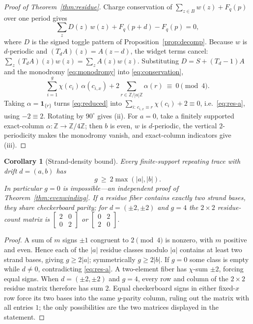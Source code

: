 \documentclass[11pt,letterpaper]{article}
\theoremstyle{plain}
\newtheorem{corollary}[theorem]{Corollary}
\theoremstyle{definition}
\newcommand{\Z}{\mathbb{Z}}
\newcommand{\che}{\chi}
\newcommand{\drift}{d}
\newcommand{\growth}{g}
\begin{document}
\begin{NoHyper}
\begin{proof}[Proof of Theorem~\ref{thm:residue}]
Charge conservation of $\sum_{z\in B}w(z)+F_q(p)$ over one period gives
\begin{equation}\label{eq:conservation}
\sum_{z}D(z)\,w(z)+F_q(p+\drift)-F_q(p)=0,
\end{equation}
where $D$ is the signed toggle pattern of Proposition~\ref{prop:decomp}. Because $w$
is $\drift$-periodic and $(T_\drift A)(z)=A(z-\drift)$, the widget terms cancel:
$\sum_z(T_\drift A)(z)w(z)=\sum_zA(z)w(z)$. Substituting $D=S+(T_\drift-1)A$ and the
monodromy \eqref{eq:monodromy} into \eqref{eq:conservation},
\begin{equation}\label{eq:reduced}
\sum_{i=1}^{\growth}\che(c_i)\,\alpha(c_{i,x})+2\sum_{r\in\Z/|a|\Z}\alpha(r)\ \equiv\ 0\pmod4 .
\end{equation}
Taking $\alpha=\mathbf 1_{\{r\}}$ turns \eqref{eq:reduced} into
$\sum_{i:\,c_{i,x}\equiv r}\che(c_i)+2\equiv0$, i.e.\ \eqref{eq:res-a}, using
$-2\equiv2$. Rotating by $90^\circ$ gives (ii). For $a=0$, take a finitely supported
exact-column $\alpha:\Z\to\Z/4\Z$; then $b$ is even, $w$ is $\drift$-periodic, the
vertical $2$-periodicity makes the monodromy vanish, and exact-column indicators give
(iii).
\end{proof}

\begin{corollary}[Strand-density bound]\label{cor:P16}
Every finite-support repeating trace with drift $\drift=(a,b)$ has
\begin{equation}\label{eq:P16}
\growth\ \ge\ 2\max(|a|,|b|).
\end{equation}
In particular $\growth=0$ is impossible---an independent proof of
Theorem~\ref{thm:evenwinding}. If a residue fiber contains exactly two strand bases,
they share checkerboard parity; for $\drift=(\pm2,\pm2)$ and $\growth=4$ the
$2\times2$ residue-count matrix is $\left[\begin{smallmatrix}2&0\\0&2\end{smallmatrix}\right]$
or $\left[\begin{smallmatrix}0&2\\2&0\end{smallmatrix}\right]$.
\end{corollary}

\begin{proof}
A sum of $m$ signs $\pm1$ congruent to $2\pmod4$ is nonzero, with $m$ positive and
even. Hence each of the $|a|$ residue classes modulo $|a|$ contains at least two
strand bases, giving $\growth\ge2|a|$; symmetrically $\growth\ge2|b|$. If $\growth=0$
some class is empty while $\drift\neq0$, contradicting \eqref{eq:res-a}. A two-element
fiber has $\che$-sum $\pm2$, forcing equal signs. When
$\drift=(\pm2,\pm2)$ and $\growth=4$, every row and column of the $2\times2$ residue
matrix therefore has sum $2$. Equal checkerboard signs in either fixed-$x$ row force
its two bases into the same $y$-parity column, ruling out the matrix with all entries
$1$; the only possibilities are the two matrices displayed in the statement.
\end{proof}


\end{NoHyper}
\end{document}
